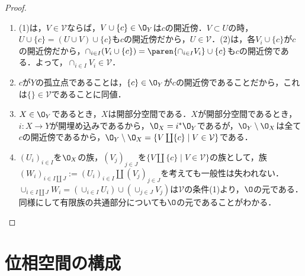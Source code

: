 \documentclass[uplatex,dvipdfmx]{jsreport}
\begin{document}
\begin{proof}\mbox{}
    \begin{enumerate}
        \item (1)は，$V\in\mathcal{V}$ならば，$V\cup\{c\}\in\O_Y$は$c$の開近傍．$V\subset U$の時，$U\cup\{c\}=(U\cup V)\cup\{c\}$も$c$の開近傍だから，$U\in\mathcal{V}$．(2)は，各$V_i\cup\{c\}$が$c$の開近傍だから，$\cap_{i\in I}(V_i\cup\{c\})=\paren{\cap_{i\in I}V_i}\cup\{c\}$も$c$の開近傍である．よって，$\cap_{i\in I}V_i\in\mathcal{V}$．
        \item $c$が$Y$の孤立点であることは，$\{c\}\in\O_Y$が$c$の開近傍であることだから，これは$\{\}\in\mathcal{V}$であることに同値．
        \item $X\in\O_Y$であるとき，$X$は開部分空間である．$X$が開部分空間であるとき，$i:X\to Y$が開埋め込みであるから，$\O_X=i^*\O_Y$であるが，$\O_Y\setminus\O_X$は全て$c$の開近傍であるから，$\O_Y\setminus\O_X=\{V\coprod\{c\}\mid V\in\mathcal{V}\}$である．
        \item $(U_i)_{i\in I}$を$\O_X$の族，$(V_j)_{j\in J}$を$\{V\coprod\{c\}\mid V\in\mathcal{V}\}$の族として，族$(W_i)_{i\in I\coprod J}:=(U_i)_{i\in I}\coprod(V_j)_{j\in J}$を考えても一般性は失われない．$\cup_{i\in I\coprod J}W_i=(\cup_{i\in I}U_i)\cup(\cup_{j\in J}V_j)$は$\mathcal{V}$の条件(1)より，$\O$の元である．同様にして有限族の共通部分についても$\O$の元であることがわかる．
    \end{enumerate}
\end{proof}

\chapter{位相空間の構成}
\end{document}
